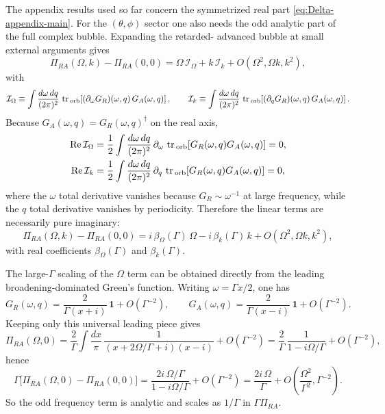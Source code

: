 \documentclass[aps,prx,preprint,amsmath,amssymb]{revtex4-2}
\newcommand{\tr}{{\rm \, tr\,}}
\renewcommand{\Re}{\text{Re}}
\begin{document}
The appendix results used so far concern the symmetrized real part
\eqref{eq:Delta-appendix-main}.  For the \((\theta,\phi)\) sector one also needs
the odd analytic part of the full complex bubble.  Expanding the retarded-
advanced bubble at small external arguments gives
\begin{equation}\label{eq:Pi-linear-expansion-app}
\Pi_{RA}(\Omega,k)-\Pi_{RA}(0,0)
=
\Omega\,\mathcal I_\Omega
+k\,\mathcal I_k
+O(\Omega^2,\Omega k,k^2),
\end{equation}
with
\begin{equation}\label{eq:Iomega-Ik-def-app}
\mathcal I_\Omega
\equiv
\int\frac{d\omega\,dq}{(2\pi)^2}\,
\tr_{\rm orb}\!\left[(\partial_\omega G_R)(\omega,q)\,G_A(\omega,q)\right],
\qquad
\mathcal I_k
\equiv
\int\frac{d\omega\,dq}{(2\pi)^2}\,
\tr_{\rm orb}\!\left[(\partial_q G_R)(\omega,q)\,G_A(\omega,q)\right].
\end{equation}
Because \(G_A(\omega,q)=G_R(\omega,q)^\dagger\) on the real axis,
\begin{align}
\Re\,\mathcal I_\Omega
&=
\frac{1}{2}
\int\frac{d\omega\,dq}{(2\pi)^2}\,
\partial_\omega\,
\tr_{\rm orb}\!\left[G_R(\omega,q)G_A(\omega,q)\right]
=0,
\label{eq:Iomega-real-zero-app}
\\
\Re\,\mathcal I_k
&=
\frac{1}{2}
\int\frac{d\omega\,dq}{(2\pi)^2}\,
\partial_q\,
\tr_{\rm orb}\!\left[G_R(\omega,q)G_A(\omega,q)\right]
=0,
\label{eq:Ik-real-zero-app}
\end{align}
where the \(\omega\) total derivative vanishes because \(G_R\sim \omega^{-1}\)
at large frequency, while the \(q\) total derivative vanishes by periodicity.
Therefore the linear terms are necessarily pure imaginary:
\begin{equation}\label{eq:Pi-linear-imag-app}
\Pi_{RA}(\Omega,k)-\Pi_{RA}(0,0)
=
i\,\beta_\Omega(\Gamma)\,\Omega
-i\,\beta_k(\Gamma)\,k
+O(\Omega^2,\Omega k,k^2),
\end{equation}
with real coefficients \(\beta_\Omega(\Gamma)\) and \(\beta_k(\Gamma)\).

The large-\(\Gamma\) scaling of the \(\Omega\) term can be obtained directly
from the leading broadening-dominated Green's function.  Writing
\(\omega=\Gamma x/2\), one has
\[
G_R(\omega,q)=\frac{2}{\Gamma(x+i)}\,\mathbf{1}+O(\Gamma^{-2}),
\qquad
G_A(\omega,q)=\frac{2}{\Gamma(x-i)}\,\mathbf{1}+O(\Gamma^{-2}).
\]
Keeping only this universal leading piece gives
\begin{equation}\label{eq:PiOmega-leading-app}
\Pi_{RA}(\Omega,0)
=
\frac{2}{\Gamma}
\int\frac{dx}{\pi}\,
\frac{1}{(x+2\Omega/\Gamma+i)(x-i)}
+O(\Gamma^{-2})
=
\frac{2}{\Gamma}\,
\frac{1}{1-i\Omega/\Gamma}
+O(\Gamma^{-2}),
\end{equation}
hence
\begin{equation}\label{eq:Omega-linear-leading-app}
\Gamma\bigl[\Pi_{RA}(\Omega,0)-\Pi_{RA}(0,0)\bigr]
=
\frac{2i\,\Omega/\Gamma}{1-i\Omega/\Gamma}
+O(\Gamma^{-2})
=
\frac{2i\,\Omega}{\Gamma}
+O\!\left(\frac{\Omega^2}{\Gamma^2},\Gamma^{-2}\right).
\end{equation}
So the odd frequency term is analytic and scales as \(1/\Gamma\) in
\(\Gamma\Pi_{RA}\).
\end{document}
